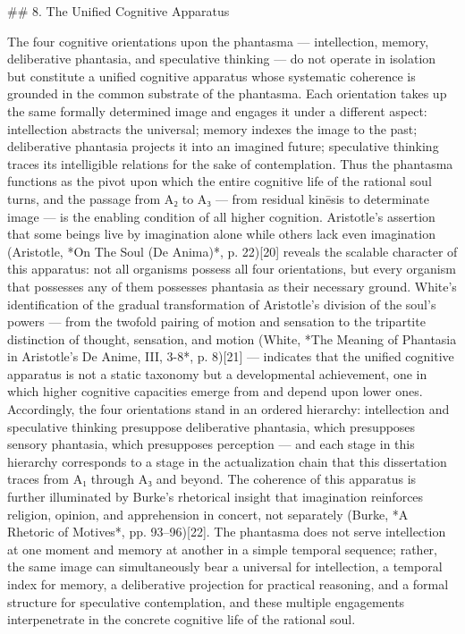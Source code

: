 ## 8. The Unified Cognitive Apparatus

The four cognitive orientations upon the phantasma — intellection, memory, deliberative phantasia, and speculative thinking — do not operate in isolation but constitute a unified cognitive apparatus whose systematic coherence is grounded in the common substrate of the phantasma. Each orientation takes up the same formally determined image and engages it under a different aspect: intellection abstracts the universal; memory indexes the image to the past; deliberative phantasia projects it into an imagined future; speculative thinking traces its intelligible relations for the sake of contemplation. Thus the phantasma functions as the pivot upon which the entire cognitive life of the rational soul turns, and the passage from A₂ to A₃ — from residual kinēsis to determinate image — is the enabling condition of all higher cognition. Aristotle's assertion that some beings live by imagination alone while others lack even imagination (Aristotle, *On The Soul (De Anima)*, p. 22)[20] reveals the scalable character of this apparatus: not all organisms possess all four orientations, but every organism that possesses any of them possesses phantasia as their necessary ground. White's identification of the gradual transformation of Aristotle's division of the soul's powers — from the twofold pairing of motion and sensation to the tripartite distinction of thought, sensation, and motion (White, *The Meaning of Phantasia in Aristotle's De Anime, III, 3-8*, p. 8)[21] — indicates that the unified cognitive apparatus is not a static taxonomy but a developmental achievement, one in which higher cognitive capacities emerge from and depend upon lower ones. Accordingly, the four orientations stand in an ordered hierarchy: intellection and speculative thinking presuppose deliberative phantasia, which presupposes sensory phantasia, which presupposes perception — and each stage in this hierarchy corresponds to a stage in the actualization chain that this dissertation traces from A₁ through A₃ and beyond. The coherence of this apparatus is further illuminated by Burke's rhetorical insight that imagination reinforces religion, opinion, and apprehension in concert, not separately (Burke, *A Rhetoric of Motives*, pp. 93–96)[22]. The phantasma does not serve intellection at one moment and memory at another in a simple temporal sequence; rather, the same image can simultaneously bear a universal for intellection, a temporal index for memory, a deliberative projection for practical reasoning, and a formal structure for speculative contemplation, and these multiple engagements interpenetrate in the concrete cognitive life of the rational soul. 

